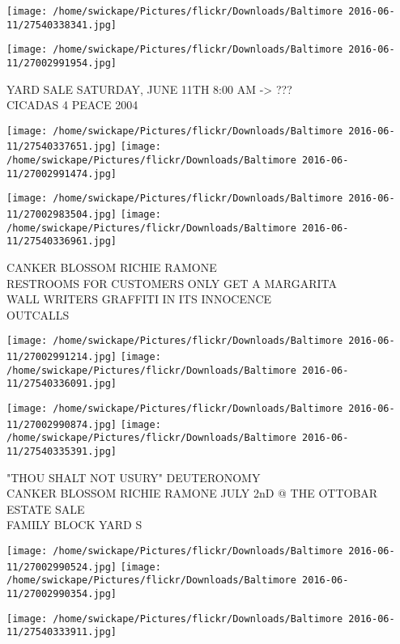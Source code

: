 \documentclass[10pt,letterpaper]{article}
\begin{document}
\texttt{[image: /home/swickape/Pictures/flickr/Downloads/Baltimore 2016-06-11/27540338341.jpg]}

\vspace{0.25in}
\texttt{[image: /home/swickape/Pictures/flickr/Downloads/Baltimore 2016-06-11/27002991954.jpg]}

YARD SALE SATURDAY, JUNE 11TH 8:00 AM {-}> ???\\
CICADAS 4 PEACE 2004
\pagebreak

\texttt{[image: /home/swickape/Pictures/flickr/Downloads/Baltimore 2016-06-11/27540337651.jpg]}
\texttt{[image: /home/swickape/Pictures/flickr/Downloads/Baltimore 2016-06-11/27002991474.jpg]}

\texttt{[image: /home/swickape/Pictures/flickr/Downloads/Baltimore 2016-06-11/27002983504.jpg]}
\texttt{[image: /home/swickape/Pictures/flickr/Downloads/Baltimore 2016-06-11/27540336961.jpg]}

CANKER BLOSSOM RICHIE RAMONE\\
RESTROOMS FOR CUSTOMERS ONLY GET A MARGARITA\\
WALL WRITERS GRAFFITI IN ITS INNOCENCE\\
OUTCALLS
\pagebreak

\texttt{[image: /home/swickape/Pictures/flickr/Downloads/Baltimore 2016-06-11/27002991214.jpg]}
\texttt{[image: /home/swickape/Pictures/flickr/Downloads/Baltimore 2016-06-11/27540336091.jpg]}

\texttt{[image: /home/swickape/Pictures/flickr/Downloads/Baltimore 2016-06-11/27002990874.jpg]}
\texttt{[image: /home/swickape/Pictures/flickr/Downloads/Baltimore 2016-06-11/27540335391.jpg]}

"THOU SHALT NOT USURY" DEUTERONOMY\\
CANKER BLOSSOM RICHIE RAMONE JULY 2nD @ THE OTTOBAR\\
ESTATE SALE\\
FAMILY BLOCK YARD S
\pagebreak

\texttt{[image: /home/swickape/Pictures/flickr/Downloads/Baltimore 2016-06-11/27002990524.jpg]}
\texttt{[image: /home/swickape/Pictures/flickr/Downloads/Baltimore 2016-06-11/27002990354.jpg]}

\vspace{0.25in}
\texttt{[image: /home/swickape/Pictures/flickr/Downloads/Baltimore 2016-06-11/27540333911.jpg]}
\end{document}
